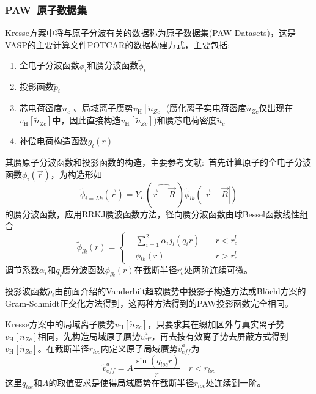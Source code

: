 \documentclass{article}      %
\newcommand{\upcite}[1]{\hspace{0ex}\textsuperscript{\cite{#1}}} %
\begin{document}
\subsubsection{\rm{PAW~}原子数据集}
\textrm{Kresse}方案中将与原子分波有关的数据称为原子数据集(\textrm{PAW Datasets})，这是\textrm{VASP}的主要计算文件\textrm{POTCAR}的数据构建方式，主要包括:~
\begin{enumerate}
	\item 全电子分波函数$\phi_i$和赝分波函数$\tilde\phi_i$
	\item 投影函数$\tilde p_i$
	\item 芯电荷密度$n_c$ 、局域离子赝势$v_{\mathrm H}[\tilde n_{Zc}]$(赝化离子实电荷密度$\tilde n_{Zc}$仅出现在$v_{\mathrm H}[\tilde n_{Zc}]$中，因此直接构造$v_{\mathrm H}[\tilde n_{Zc}]$)和赝芯电荷密度$\tilde n_c$
	\item 补偿电荷构造函数$g_l(r)$
\end{enumerate}

其赝原子分波函数和投影函数的构造，主要参考文献\cite{JPCM6-8245_1994}:~首先计算原子的全电子分波函数$\phi_i(\vec r)$，为构造形如
	\begin{equation}
		\tilde\phi_{i=Lk}(\vec r)=Y_L(\widehat{\vec r-\vec R}~)\tilde\phi_{lk}(|\vec r-\vec R|)
	\end{equation}
	的赝分波函数，应用\textrm{RRKJ}赝波函数方法\upcite{PRB41-1227_1990}，径向赝分波函数由球\textrm{Bessel}函数线性组合
	\begin{equation}
		\tilde\phi_{lk}(r)=\left\{
		\begin{aligned}
			&\sum_{i=1}^2\alpha_ij_l(q_ir)\quad &r<r_c^l\\
			&\phi_{lk}(r)\quad&r>r_c^l
		\end{aligned}
		\right.
	\end{equation}
调节系数$\alpha_i$和$q_i$赝分波函数$\phi_{lk}(r)$在截断半径$r_c^l$处两阶连续可微。

投影波函数$\tilde p_i$由前面介绍的\textrm{Vanderbilt}超软赝势中投影子构造方法\upcite{PRB41-7892_1990}或\textrm{Bl\"ochl}方案的\textrm{Gram-Schmidt}正交化方法\upcite{PRB50-17953_1994}得到，这两种方法得到的\textrm{PAW}投影函数完全相同。

\textrm{Kresse}方案中的局域离子赝势$v_{\mathrm H}[\tilde n_{Zc}]$，只要求其在缀加区外与真实离子势$v_{\mathrm H}[n_{Zc}]$相同，先构造局域原子赝势$\tilde v_{\mathrm{eff}}^a$，再去按有效离子势去屏蔽方式得到$v_{\mathrm H}[\tilde n_{Zc}]$。在截断半径$r_{loc}$内定义原子局域赝势$\tilde v_{eff}^a$为
$$\tilde v_{eff}^a=A\dfrac{\sin(q_{loc}r)}r\quad r<r_{loc}$$
这里$q_{loc}$和$A$的取值要求是使得局域赝势在截断半径$r_{loc}$处连续到一阶。
\end{document}
